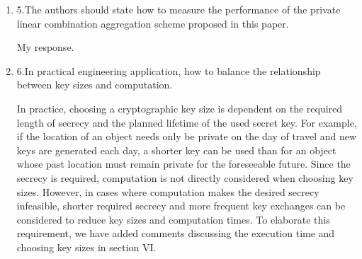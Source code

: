 \documentclass[a4paper]{scrartcl}
\newenvironment{rebuttal}{\begin{enumerate}[label={\color{grey}\thesection.\arabic{enumi}},leftmargin=0pt,ref=\thesection.\arabic{enumi}]}{\end{enumerate}}
\newcommand{\reviewtext}[1]{{\color{nblue} #1}}
\begin{document}
\begin{rebuttal}
We hope this reasoning 
backs the reasoning for excluding a complexity analysis in the work

\item \reviewtext{5.The authors should state how to measure the performance of the private linear combination aggregation scheme proposed in this paper.}

My response.

\item \reviewtext{6.In practical engineering application, how to balance the relationship between key sizes and computation.}

In practice, choosing a cryptographic key size is dependent on the required length of secrecy and the planned lifetime of the used secret key. For example, if the location of an object needs only be private on the day of travel and new keys are generated each day, a shorter key can be used than for an object whose past location must remain private for the foreseeable future. Since the secrecy is required, computation is not directly considered when choosing key sizes. However, in cases where computation makes the desired secrecy infeasible, shorter required secrecy and more frequent key exchanges can be considered to reduce key sizes and computation times. To elaborate this requirement, we have added comments discussing the execution time and choosing key sizes in section VI.

\end{rebuttal}


\end{document}
